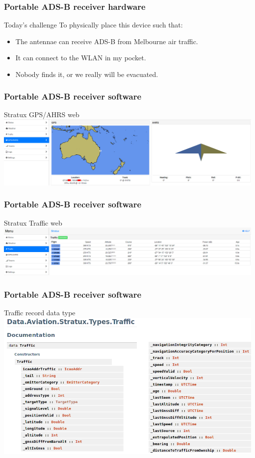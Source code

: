 \begin{frame}
\frametitle{Portable ADS-B receiver hardware}
\begin{block}{Today's challenge}
To physically place this device such that:
\begin{itemize}
\item<1-> The antennae can receive ADS-B from Melbourne air traffic.
\item<1-> It can connect to the WLAN in my pocket.
\item<2-> Nobody finds it, or we really will be evacuated.
\end{itemize}
\end{block}
\end{frame}

\begin{frame}
\frametitle{Portable ADS-B receiver software}
\begin{block}{Stratux GPS/AHRS web}
\includegraphics[height=0.32\textheight]{image/stratux-gps-ahrs-web.png}
\end{block}
\end{frame}

\begin{frame}
\frametitle{Portable ADS-B receiver software}
\begin{block}{Stratux Traffic web}
\includegraphics[height=0.23\textheight]{image/stratux-traffic-web.png}
\end{block}
\end{frame}

\begin{frame}
\frametitle{Portable ADS-B receiver software}
\begin{block}{Traffic record data type}
\includegraphics[height=0.6\textheight]{image/stratux-traffic-record.png}
\end{block}
\end{frame}


